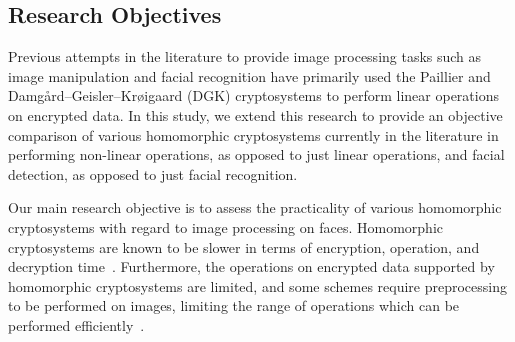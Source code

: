 


\subsection{Research Objectives}
Previous attempts in the literature to provide image processing tasks such as image manipulation \cite{ziad_cryptoimg:_2016} and  facial recognition \cite{hutchison_privacy-preserving_2009} have primarily used the Paillier and  Damg{\aa}rd--Geisler--Kr{\o}igaard (DGK) cryptosystems to perform linear operations on encrypted data. In this study, we extend this research to provide an objective comparison of various homomorphic cryptosystems currently in the literature in performing non-linear operations, as opposed to just linear operations, and facial detection, as opposed to just facial recognition.

Our main research objective is to assess the practicality of various homomorphic cryptosystems with regard to image processing on faces. Homomorphic cryptosystems are known to be slower in terms of encryption, operation, and decryption time~\cite{sen_homomorphic_2013}. Furthermore, the operations on encrypted data supported by homomorphic cryptosystems are limited, and some schemes require preprocessing to be performed on images, limiting the range of operations which can be performed efficiently~\cite{li_elliptic_2012}.

